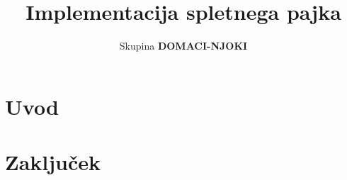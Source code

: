 \documentclass[conference]{IEEEtran}
\begin{document}
	
	\title{Implementacija spletnega pajka}
	
	\author{Skupina \textbf{DOMACI-NJOKI}}
	
	\maketitle
	
	\begin{abstract}		
	\end{abstract}
	
	\IEEEpeerreviewmaketitle
	
	\section{Uvod}
	
	\section{Zaključek}
	
	
	
	
\end{document}
